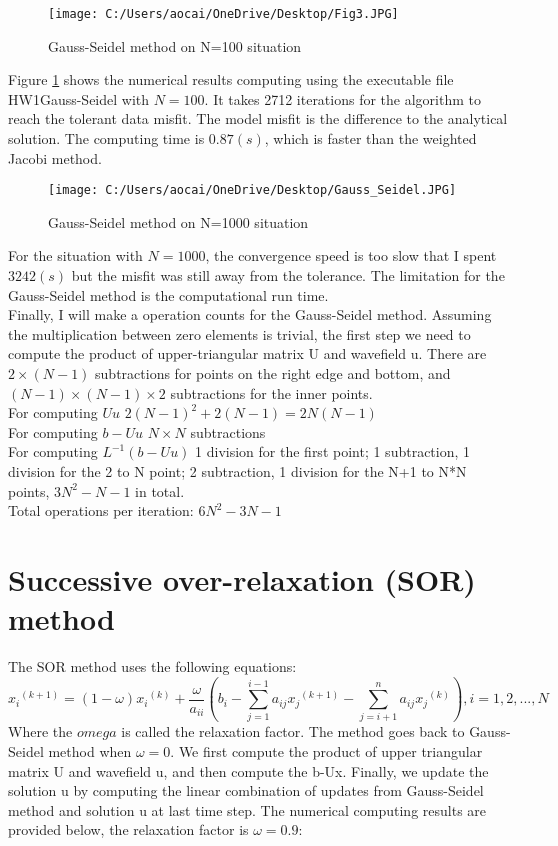 \documentclass[12pt]{article}
\begin{document}
\begin{figure}[H]
	\centering
	\texttt{[image: C:/Users/aocai/OneDrive/Desktop/Fig3.JPG]}
	\caption[Optional caption]{Gauss-Seidel method on N=100 situation}
	\label{fig:4}
\end{figure}
Figure \ref{fig:4} shows the numerical results computing using the executable file HW1Gauss-Seidel with $N=100$. It takes 2712 iterations for the algorithm to reach the tolerant data misfit. The model misfit is the difference to the analytical solution. The computing time is $0.87(s)$, which is faster than the weighted Jacobi method.

\begin{figure}[H]
	\centering
	\texttt{[image: C:/Users/aocai/OneDrive/Desktop/Gauss\_Seidel.JPG]}
	\caption[Optional caption]{Gauss-Seidel method on N=1000 situation}
	\label{fig:5}
\end{figure}

For the situation with $N=1000$, the convergence speed is too slow that I spent $ 3242 (s)$ but the misfit was still away from the tolerance. The limitation for the Gauss-Seidel method is the computational run time.\\

Finally, I will make a operation counts for the Gauss-Seidel method. Assuming the multiplication between zero elements is trivial, the first step we need to compute the product of upper-triangular matrix U and wavefield u. There are $2\times(N-1)$ subtractions for points on the right edge and bottom, and $(N-1)\times(N-1)\times2$ subtractions for the inner points.\\
For computing $Uu$ $2{(N-1)}^2 + 2(N-1) = 2N(N-1)$\\
For computing $b-Uu$ $N \times N$ subtractions\\
For computing $L^{-1}(b-Uu)$ 1 division for the first point; 1 subtraction, 1 division for the 2 to N point; 2 subtraction, 1 division for the N+1 to N*N points, $3N^2-N-1$ in total.  \\
Total operations per iteration: $6N^2 - 3N -1$

\section{Successive over-relaxation (SOR) method}
The SOR method uses the following equations:
$${x_i}^{(k+1)} = (1-\omega){x_i}^{(k)} + \frac{\omega}{a_{ii}} \left( b_i - \sum_{j=1}^{i-1}a_{ij}{x_j}^{(k+1)} -\sum_{j=i+1}^{n}a_{ij}{x_j}^{(k)} \right), i= 1,2,...,N$$
Where the $omega$ is called the relaxation factor. The method goes back to Gauss-Seidel method when $\omega=0$. We first compute the product of upper triangular matrix U and wavefield u, and then compute the b-Ux. Finally, we update the solution u by computing the linear combination of updates from Gauss-Seidel method and solution u at last time step. The numerical computing results are provided below, the relaxation factor is $\omega = 0.9$:
\end{document}

